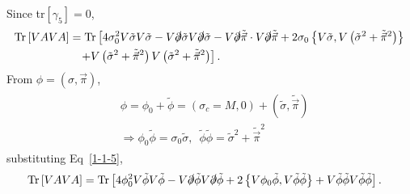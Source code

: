 \documentclass[tightenlines,floatfix,nofootinbib,superscriptaddress,fleqn]{revtex4-2}
\begin{document}
Since tr$[\gamma_5]=0$,
\begin{align}\label{1-1-5}
  \begin{split}
    \mathrm{Tr}\left[VAVA\right]
    &=\mathrm{Tr}\left[4\sigma^2_0V\tilde{\sigma}V\tilde{\sigma}
    -V\slashed{\partial}\tilde{\sigma}V\slashed{\partial}\tilde{\sigma}
    -V\slashed{\partial}\tilde{\vec{\pi}}\cdot V\slashed{\partial}\tilde{\vec{\pi}}
    +2\sigma_0\left\{V\tilde{\sigma},V\left(\tilde{\sigma}^2+\tilde{\vec{\pi}}^2\right)
    \right\}
    \right.\\
    &\left.\,\,\,\,\,
    +V\left(\tilde{\sigma}^2+\tilde{\vec{\pi}}^2\right)V\left(\tilde{\sigma}^2
    +\tilde{\vec{\pi}}^2\right)
    \right].
  \end{split}
\end{align}
From $\phi=(\sigma,\vec{\pi})$,
\begin{align}\label{1-1-6}
  \begin{split}
    &\phi=\phi_0+\tilde{\phi}
    =(\sigma_c=M,0)+(\tilde{\sigma},\tilde{\vec{\pi}}) \\
    &\Longrightarrow \phi_0\tilde{\phi}=\sigma_0\tilde{\sigma},\,\,\,
    \tilde{\phi}\tilde{\phi}=\tilde{\sigma}^2+\tilde{\vec{\pi}}^2
  \end{split}
\end{align}
substituting Eq~\eqref{1-1-5},
\begin{align}\label{1-1-7}
  \begin{split}
    \mathrm{Tr}\left[VAVA\right]
    &=\mathrm{Tr}\left[
    4\phi_0^2V\tilde{\phi}V\tilde{\phi}
    -V\slashed{\partial}\tilde{\phi} 
     V\slashed{\partial}\tilde{\phi}
    +2\left\{V\phi_0\tilde{\phi},V\tilde{\phi}\tilde{\phi}
    \right\}
    +V\tilde{\phi}\tilde{\phi}V\tilde{\phi}\tilde{\phi}
    \right].
  \end{split}
\end{align}
\end{document}
